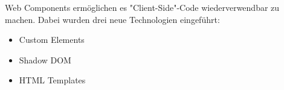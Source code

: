 

Web Components ermöglichen es "Client-Side"-Code wiederverwendbar zu machen. Dabei wurden drei neue Technologien eingeführt:

\begin{itemize}
    \item Custom Elements
    \item Shadow DOM
    \item HTML Templates
\end{itemize}

\cite{MDNWebComponents}